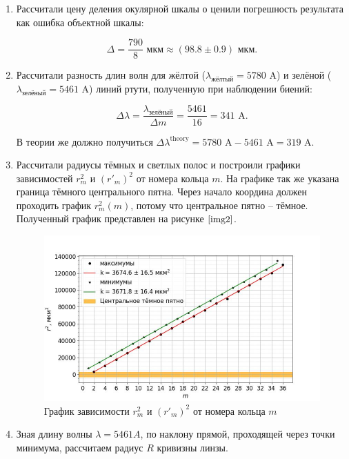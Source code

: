 \documentclass[a4paper,12pt]{article} %
\begin{document}
\begin{enumerate}
    \item Рассчитали цену деления окулярной шкалы о ценили погрешность результата как ошибка объектной шкалы:

    \[ \Delta=\frac{790}{8}\text{ мкм}\approx(98.8\pm0.9)\text{ мкм}. \]

    \item Рассчитали разность длин волн для жёлтой ($\lambda_{\text{жёлтый}}=5780\text{ A}$) и зелёной ($\lambda_{\text{зелёный}}=5461\text{ A}$) линий ртути, полученную при наблюдении биений:

    \[ \Delta\lambda=\frac{\lambda_{\text{зелёный}}}{\Delta m}=\frac{5461}{16}=341\text{ A}. \]

    В теории же должно получиться $\Delta\lambda^{\text{theory}}=5780\text{ A}-5461\text{ A}=319\text{ A}$.
    
    \item Рассчитали радиусы тёмных и светлых полос и построили графики зависимостей $r^2_{m}$ и $(r'_{m})^2$ от номера кольца $m$. На графике так же указана граница тёмного центрального пятна. Через начало координа должен проходить график $r_{m}^2(m)$, потому что центральное пятно -- тёмное. Полученный график представлен на рисунке $\ref{img2}$.

    \begin{figure}[h]
        \begin{center}
            \includegraphics[width=18cm]{image2.jpg}
        \end{center}
        \caption{График зависимости $r^2_{m}$ и $(r'_{m})^2$ от номера кольца $m$}
        \label{img2}
    \end{figure}

    \item Зная длину волны $\lambda=5461 A$, по наклону прямой, проходящей через точки минимума, рассчитаем радиус $R$ кривизны линзы.


\end{enumerate}
\end{document}
